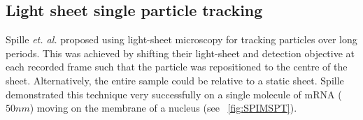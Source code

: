 \subsection{Light sheet single particle tracking}

Spille \emph{et. al.} proposed using light-sheet microscopy for tracking particles over long periods.
This was achieved by shifting their light-sheet and detection objective at each recorded frame such that the particle was repositioned to the centre of the sheet.
Alternatively, the entire sample could be relative to a static sheet.
Spille demonstrated this technique very successfully on a single molecule of mRNA (\(50 nm\)\cite{Spille2015a}) moving on the membrane of a nucleus\cite{Spille2015a} (see \figurename~\ref{fig:SPIMSPT}).
%
%
%
%



